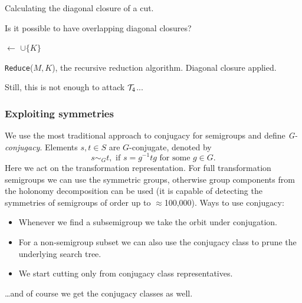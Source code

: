 \documentclass{beamer}
\newcommand{\cT}{{\cal T}}
\newcommand{\jump}{\vskip6pt}
\begin{document}
\begin{frame}[fragile]
\begin{algorithm}[H]
\caption{Calculating the diagonal closure of a cut.}
\label{alg:diagonalclosure}
\end{algorithm}
\jump
Is it possible to have overlapping diagonal closures?
\end{frame}

\begin{frame}[fragile]
\begin{algorithm}[H]
\BlankLine

\Visited $\leftarrow$ \Visited$\cup \{K\}$\;
\caption{\texttt{Reduce}($M,K$), the recursive reduction algorithm.  Diagonal closure applied.}
\label{alg:basicrecursive}
\end{algorithm}
\pause
Still, this is not enough to attack $\cT_4$... 
\end{frame}


\begin{frame}\frametitle{Exploiting symmetries}
We use the most traditional approach to conjugacy for semigroups  and define \emph{G-conjugacy}. Elements $s,t\in S$ are $G$-conjugate, denoted by
$$s\sim_G t, \text{ if } s=g^{-1}tg \text{ for some } g\in G.$$ 
\jump
Here we act on the transformation representation.
For full transformation semigroups we can use the symmetric groups, otherwise group components from the holonomy decomposition can be used (it is capable of detecting the symmetries of semigroups of order up to $\approx$100,000). 
\jump
Ways to use conjugacy:
\begin{itemize}
\item Whenever we find a subsemigroup we take the orbit under conjugation.
\item For a non-semigroup subset we can also use the conjugacy class to prune the underlying search tree. 
\item We start cutting only from conjugacy class representatives.
\end{itemize}
\ldots and of course we get the conjugacy classes as well.
\end{frame}
\end{document}
